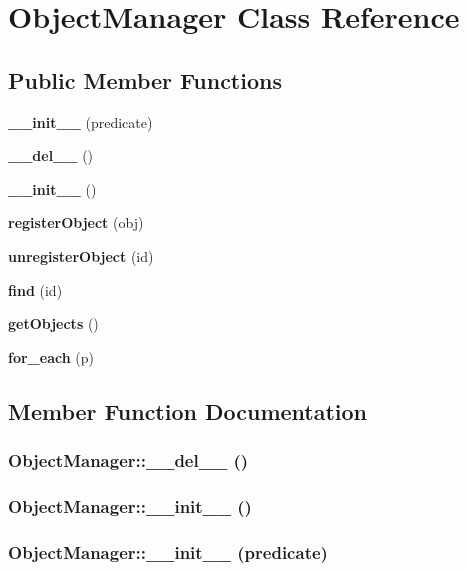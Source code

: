 \section{Object\-Manager Class Reference}
\label{classObjectManager}
\subsection*{Public Member Functions}
\begin{CompactItemize}
\item 
{\bf \_\-\_\-init\_\-\_\-} (predicate)
\item 
{\bf \_\-\_\-del\_\-\_\-} ()
\item 
{\bf \_\-\_\-init\_\-\_\-} ()
\item 
{\bf register\-Object} (obj)
\item 
{\bf unregister\-Object} (id)
\item 
{\bf find} (id)
\item 
{\bf get\-Objects} ()
\item 
{\bf for\_\-each} (p)
\end{CompactItemize}


\subsection{Member Function Documentation}
\subsubsection{\setlength{\rightskip}{0pt plus 5cm}Object\-Manager::\_\-\_\-del\_\-\_\- ()}\label{classObjectManager_ObjectManagera1}


\subsubsection{\setlength{\rightskip}{0pt plus 5cm}Object\-Manager::\_\-\_\-init\_\-\_\- ()}\label{classObjectManager_ObjectManagera2}


\subsubsection{\setlength{\rightskip}{0pt plus 5cm}Object\-Manager::\_\-\_\-init\_\-\_\- (predicate)}\label{classObjectManager_ObjectManagera0}


